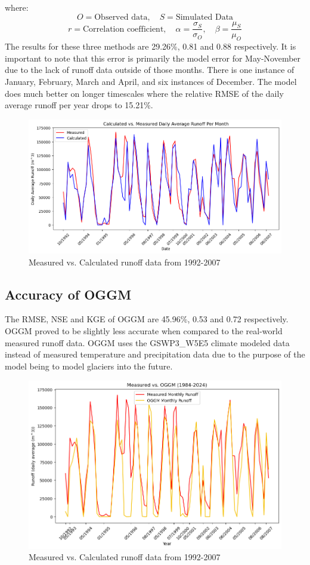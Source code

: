 \documentclass{article}
\begin{document}
\noindent where:
$$O = \text{Observed data}, \quad S=\text{Simulated Data}$$
$$r = \mbox{Correlation coefficient}, \quad \alpha = \frac{\sigma_S}{\sigma_O}, \quad \beta = \frac{\mu_S}{\mu_O}$$
The results for these three methods are 29.26\%, 0.81 and 0.88 respectively. It is important to note that this error is primarily the model error for 
May-November due to the lack of runoff data outside of those months. There is one instance of January, February, March and April, and six 
instances of December. The model does much better on longer timescales where the relative RMSE of the daily average runoff 
per year drops to 15.21\%.
\begin{figure}[h!]
    \centering
    \includegraphics[width=\textwidth]{Plots/calc_vs_measured.png}
    \caption{Measured vs. Calculated runoff data from 1992-2007}
    \label{fig:calc_vs_measured}
\end{figure}
\FloatBarrier
\subsection{Accuracy of OGGM}
The RMSE, NSE and KGE of OGGM are 45.96\%, 0.53 and 0.72 respectively. OGGM proved to be slightly less accurate when 
compared to the real-world measured runoff data. OGGM uses the GSWP3\_W5E5 climate modeled data instead of measured temperature and precipitation 
data due to the purpose of the model being to model glaciers into the future.
\begin{figure}[h!]
    \centering
    \includegraphics[width=\textwidth]{Plots/oggm_vs_measured.png}
    \caption{Measured vs. Calculated runoff data from 1992-2007}
    \label{fig:oggm_vs_measured}
\end{figure}
\FloatBarrier
\end{document}
